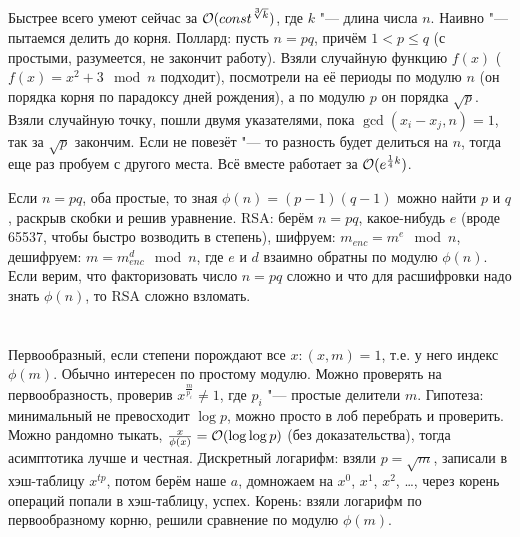 \section{} %
Быстрее всего умеют сейчас за $\mathcal{O}(const ^{\sqrt[3]{k}})$, где $k$ "--- длина числа $n$.
Наивно "--- пытаемся делить до корня.
Поллард: пусть $n=pq$, причём $1 < p \le q$ (с простыми, разумеется, не закончит работу).
Взяли случайную функцию $f(x)$ ($f(x)=x^2+3\mod n$ подходит), посмотрели на её периоды по модулю $n$ (он порядка корня по парадоксу дней рождения),
а по модулю $p$ он порядка $\sqrt p$.
Взяли случайную точку, пошли двумя указателями, пока $\gcd(x_i - x_j, n) = 1$, так за $\sqrt p$ закончим.
Если не повезёт "--- то разность будет делиться на $n$, тогда еще раз пробуем с другого места.
Всё вместе работает за $\mathcal{O}(e^{\frac14k})$.

Если $n=pq$, оба простые, то зная $\phi(n)=(p-1)(q-1)$ можно найти $p$ и $q$, раскрыв скобки и решив уравнение.
RSA: берём $n=pq$, какое-нибудь $e$ (вроде 65537, чтобы быстро возводить в степень), шифруем: $m_{enc}=m^e \mod n$,
дешифруем: $m=m_{enc}^d \mod n$, где $e$ и $d$ взаимно обратны по модулю $\phi(n)$.
Если верим, что факторизовать число $n=pq$ сложно и что для расшифровки надо знать $\phi(n)$, то RSA сложно взломать.

\section{} %
Первообразный, если степени порождают все $x \colon (x,m)=1$, т.е. у него индекс $\phi(m)$.
Обычно интересен по простому модулю.
Можно проверять на первообразность, проверив $x^{\frac{m}{p_i}} \neq 1$, где $p_i$ "--- простые делители $m$.
Гипотеза: минимальный не превосходит $\log p$, можно просто в лоб перебрать и проверить.
Можно рандомно тыкать, $\frac{x}{\phi(x)} = \mathcal{O}(\log \log p)$ (без доказательства), тогда асимптотика лучше и честная.
Дискретный логарифм: взяли $p=\sqrt m$, записали в хэш-таблицу $x^{tp}$, потом берём наше $a$, домножаем на $x^0$, $x^1$, $x^2$, \dots,
через корень операций попали в хэш-таблицу, успех.
Корень: взяли логарифм по первообразному корню, решили сравнение по модулю $\phi(m)$.

